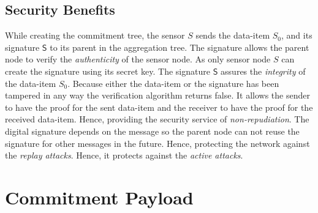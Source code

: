 	\subsection{Security Benefits}
		\label{subsec:security benefits of signing the data-item}
		While creating the commitment tree, the sensor $S$ sends the data-item $S_{0}$, and its signature $\textsf{S}$ to its parent in the aggregation tree.
		The signature allows the parent node to verify the \textit{authenticity} of the sensor node.
		As only sensor node $S$ can create the signature using its secret key. 
		The signature $\textsf{S}$ assures the \textit{integrity} of the data-item $S_{0}$.
		Because either the data-item or the signature has been tampered in any way the verification algorithm returns false.
		It allows the sender to have the proof for the sent data-item and the receiver to have the proof for the received data-item.
		Hence, providing the security service of \textit{non-repudiation}.
		The digital signature depends on the message so the parent node can not reuse the signature for other messages in the future.
		Hence, protecting the network against the \textit{replay attacks}.
		Hence, it protects against the \textit{active attacks}.

\section{Commitment Payload}

